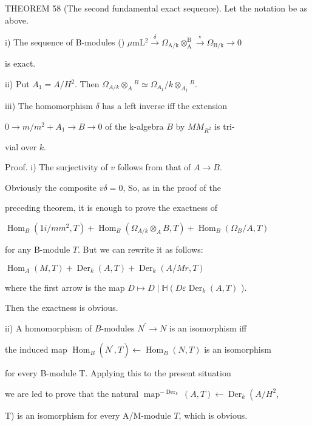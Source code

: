 THEOREM 58 (The second fundamental exact sequence). Let the notation be as above.

i) The sequence of B-modules () $\mu \mathrm{mL}{ }^{2} \stackrel{\delta}{\rightarrow} \Omega_{\mathrm{A} / \mathrm{k}} \otimes_{\mathrm{A}}^{\mathrm{B}} \stackrel{\mathrm{v}}{\rightarrow} \Omega_{\mathrm{B} / \mathrm{k}} \rightarrow 0$

is exact.

ii) Put $A_{1}=A / H^{2}$. Then $\Omega_{A / k} \otimes_{A}{ }^{B} \simeq \Omega_{A_{1}} / k \otimes_{A_{1}}{ }^{B}$.

iii) The homomorphism $\delta$ has a left inverse iff the extension

$0 \rightarrow m / m^{2}+A_{1} \rightarrow B \rightarrow 0$ of the k-algebra $B$ by $M M_{R^{2}}$ is tri-

vial over $k$.

Proof. i) The surjectivity of $v$ follows from that of $A \rightarrow B$.

Obviously the composite $v \delta=0$, So, as in the proof of the

preceding theorem, it is enough to prove the exactness of

$\operatorname{Hom}_{B}\left(1 i / m m^{2}, T\right)+\operatorname{Hom}_{B}\left(\Omega_{A / k} \otimes_{A} B, T\right)+\operatorname{Hom}_{B}\left(\Omega_{B} / A, T\right)$

for any B-module $T$. But we can rewrite it as follows:

$\operatorname{Hom}_{A}(M, T)+\operatorname{Der}_{k}(A, T)+\operatorname{Der}_{k}(A / M r, T)$

where the first arrow is the map $D \mapsto D \mid \mathbb{H}\left(D \varepsilon \operatorname{Der}_{k}(A, T)\right.$ ).

Then the exactness is obvious.

ii) A homomorphism of $B$-modules $N^{\prime} \rightarrow N$ is an isomorphism iff

the induced map $\operatorname{Hom}_{B}\left(N^{\prime}, T\right) \leftarrow \operatorname{Hom}_{B}(N, T)$ is an isomorphism

for every B-module T. Applying this to the present situation

we are led to prove that the natural $\operatorname{map}^{-\operatorname{Der}_{k}}(A, T) \leftarrow \operatorname{Der}_{k}\left(A / H^{2}\right.$,

T) is an isomorphism for every A/M-module $T$, which is obvious.

